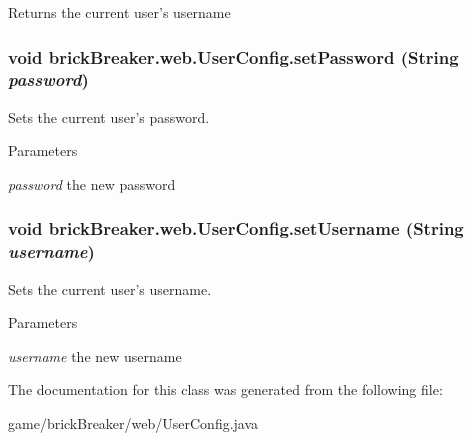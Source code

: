 \begin{DoxyReturn}{Returns}
the current user's username 
\end{DoxyReturn}
\hypertarget{classbrick_breaker_1_1web_1_1_user_config_a4b7cbc1a5c2e83db4e21ecc870b272c7}{
\subsubsection[{setPassword}]{\setlength{\rightskip}{0pt plus 5cm}void brickBreaker.web.UserConfig.setPassword (String {\em password})}}
\label{classbrick_breaker_1_1web_1_1_user_config_a4b7cbc1a5c2e83db4e21ecc870b272c7}
Sets the current user's password.


\begin{DoxyParams}{Parameters}
\item[{\em password}]the new password \end{DoxyParams}
\hypertarget{classbrick_breaker_1_1web_1_1_user_config_a4565256db7d0f30cb7f4b63bd06a7472}{
\subsubsection[{setUsername}]{\setlength{\rightskip}{0pt plus 5cm}void brickBreaker.web.UserConfig.setUsername (String {\em username})}}
\label{classbrick_breaker_1_1web_1_1_user_config_a4565256db7d0f30cb7f4b63bd06a7472}
Sets the current user's username.


\begin{DoxyParams}{Parameters}
\item[{\em username}]the new username \end{DoxyParams}


The documentation for this class was generated from the following file:\begin{DoxyCompactItemize}
\item 
game/brickBreaker/web/UserConfig.java\end{DoxyCompactItemize}
